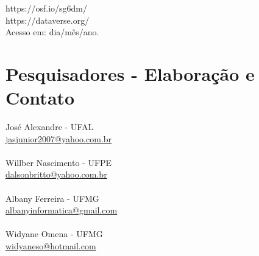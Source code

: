 \documentclass[12pt]{article}
\begin{document}
	
	 \noindent  https://osf.io/sg6dm/  \\
	 https://dataverse.org/ \\ Acesso em: dia/mês/ano. \\
	 
	\section{Pesquisadores - Elaboração e Contato}
		José Alexandre - UFAL \\
		{\color{blue}\href{mailto}{jasjunior2007@yahoo.com.br}} 
		\\ 
		
		\\
		
		 \noindent Willber Nascimento - UFPE \\
		{\color{blue}\href{mailto}{dalsonbritto@yahoo.com.br}}
		\\ \\
		Albany Ferreira - UFMG \\
		{\color{blue}\href{mailto}{albanyinformatica@gmail.com}}
		\\ \\
		Widyane Omena - UFMG \\
		{\color{blue}\href{mailto}{widyaneso@hotmail.com}}
		\\ \\
	
\end{document}
